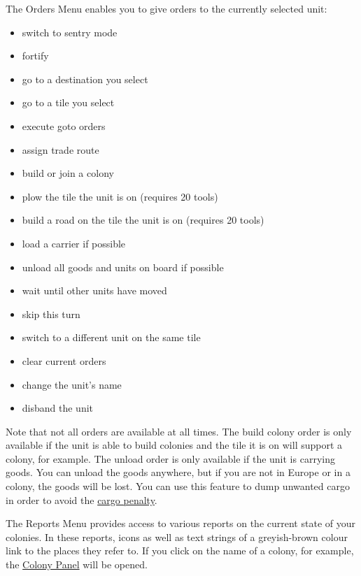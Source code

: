 \documentclass[12pt]{book}
\begin{document}
The \hypertarget{orders menu}{Orders Menu} enables you to give orders
to the currently selected unit:

\begin{itemize}
\item switch to sentry mode
\item fortify
\item go to a destination you select
\item go to a tile you select
\item execute goto orders
\item assign trade route
\item build or join a colony
\item plow the tile the unit is on (requires 20 tools)
\item build a road on the tile the unit is on (requires 20 tools)
\item load a carrier if possible
\item unload all goods and units on board if possible
\item wait until other units have moved
\item skip this turn
\item switch to a different unit on the same tile
\item clear current orders
\item change the unit's name
\item disband the unit
\end{itemize}

Note that not all orders are available at all times. The build colony
order is only available if the unit is able to build colonies and the
tile it is on will support a colony, for example. The unload order is
only available if the unit is carrying goods. You can unload the goods
anywhere, but if you are not in Europe or in a colony, the goods will
be lost.  You can use this feature to dump unwanted cargo in order to avoid the \hyperlink{Cargo Penalty}{cargo
  penalty}.

The \hypertarget{reports menu}{Reports Menu} provides access to
various reports on the current state of your colonies. In these
reports, icons as well as text strings of a greyish-brown colour link
to the places they refer to. If you click on the name of a colony, for
example, the \hyperlink{colony panel}{Colony Panel} will be opened.
\end{document}

